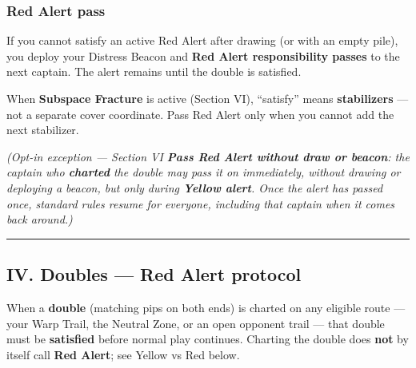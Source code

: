 \documentclass[11pt]{article}
\begin{document}
\subsubsection{Red Alert pass}\label{red-alert-pass}

If you cannot satisfy an active Red Alert after drawing (or with an
empty pile), you deploy your Distress Beacon and \textbf{Red Alert
responsibility passes} to the next captain. The alert remains until the
double is satisfied.

When \textbf{Subspace Fracture} is active (Section VI), ``satisfy''
means \textbf{stabilizers} --- not a separate cover coordinate. Pass Red Alert
only when you cannot add the next stabilizer.

\emph{(Opt-in exception --- Section VI \textbf{Pass Red Alert without
draw or beacon}: the captain who \textbf{charted} the double may pass it
on immediately, without drawing or deploying a beacon, but only during
\textbf{Yellow alert}. Once the alert has passed once, standard rules
resume for everyone, including that captain when it comes back around.)}

\begin{center}\rule{0.5\linewidth}{0.5pt}\end{center}

\subsection{IV. Doubles --- Red Alert
protocol}\label{iv-doubles--red-alert-protocol}

When a \textbf{double} (matching pips on both ends) is charted on any
eligible route --- your Warp Trail, the Neutral Zone, or an open
opponent trail --- that double must be \textbf{satisfied} before normal
play continues. Charting the double does \textbf{not} by itself call
\textbf{Red Alert}; see Yellow vs Red below.
\end{document}
